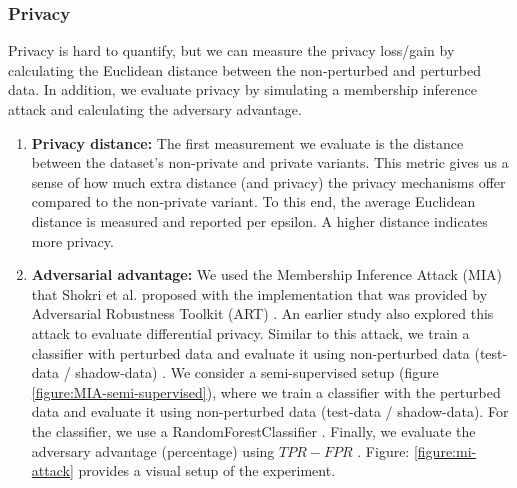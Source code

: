 \subsubsection{Privacy}
Privacy is hard to quantify, but we can measure the privacy loss/gain by calculating the Euclidean distance between the non-perturbed and perturbed data.
In addition, we evaluate privacy by simulating a membership inference attack and calculating the adversary advantage.
\begin{enumerate}
  \item \textbf{Privacy distance: }
        The first measurement we evaluate is the distance between the dataset's non-private and private variants.
        This metric gives us a sense of how much extra distance (and privacy) the privacy mechanisms offer compared to the non-private variant.
        To this end, the average Euclidean distance is measured and reported per epsilon. A higher distance indicates more privacy.
  \item \textbf{Adversarial advantage: }
        We used the Membership Inference Attack (MIA) that Shokri et al. proposed with the implementation that was provided by Adversarial Robustness Toolkit (ART) \citep{nicolae_adversarial_2019}.
        An earlier study also explored this attack to evaluate differential privacy.
        Similar to this attack, we train a classifier with perturbed data and evaluate it using non-perturbed data (test-data / shadow-data) \citep{zhao_not_2020}.
        We consider a semi-supervised setup (figure \ref{figure:MIA-semi-supervised}), where we train a classifier with the perturbed data and evaluate it using non-perturbed data (test-data / shadow-data).
        For the classifier, we use a RandomForestClassifier \citep{rigaki_survey_2021}.
        Finally, we evaluate the adversary advantage (percentage) using $TPR - FPR$ \citep{yeom_privacy_2018}.
        Figure: \ref{figure:mi-attack} provides a visual setup of the experiment.


\end{enumerate}
